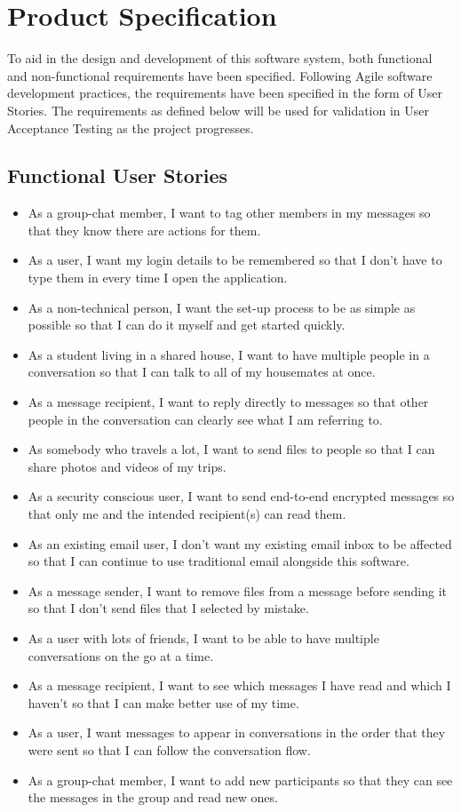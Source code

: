 \chapter{Product Specification}

To aid in the design and development of this software system, both functional and non-functional requirements have been specified. Following Agile software development practices, the requirements have been specified in the form of User Stories. The requirements as defined below will be used for validation in User Acceptance Testing as the project progresses.

\section{Functional User Stories}\label{sec:functional-spec}
\begin{itemize}
  \item As a group-chat member, I want to tag other members in my messages so that they know there are actions for them.
  \item As a user, I want my login details to be remembered so that I don't have to type them in every time I open the application.
  \item As a non-technical person, I want the set-up process to be as simple as possible so that I can do it myself and get started quickly.
  \item As a student living in a shared house, I want to have multiple people in a conversation so that I can talk to all of my housemates at once.
  \item As a message recipient, I want to reply directly to messages so that other people in the conversation can clearly see what I am referring to.
  \item As somebody who travels a lot, I want to send files to people so that I can share photos and videos of my trips.
  \item As a security conscious user, I want to send end-to-end encrypted messages so that only me and the intended recipient(s) can read them.
  \item As an existing email user, I don't want my existing email inbox to be affected so that I can continue to use traditional email alongside this software.
  \item As a message sender, I want to remove files from a message before sending it so that I don't send files that I selected by mistake.
  \item As a user with lots of friends, I want to be able to have multiple conversations on the go at a time.
  \item As a message recipient, I want to see which messages I have read and which I haven't so that I can make better use of my time.
  \item As a user, I want messages to appear in conversations in the order that they were sent so that I can follow the conversation flow.
  \item As a group-chat member, I want to add new participants so that they can see the messages in the group and read new ones.
\end{itemize}